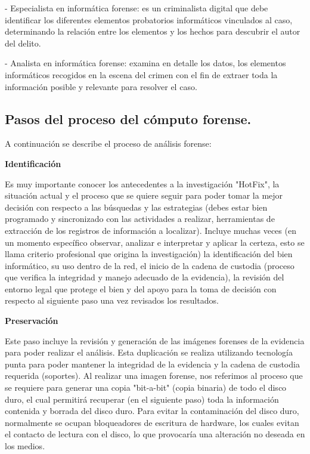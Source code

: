 - Especialista en informática forense: es un criminalista digital que debe identificar los diferentes elementos probatorios informáticos vinculados al caso, determinando la relación entre los elementos y los hechos para descubrir el autor del delito.

- Analista en informática forense: examina en detalle los datos, los elementos informáticos recogidos en la escena del crimen con el fin de extraer toda la información posible y relevante para resolver el caso.


\subsection{Pasos del proceso del cómputo forense.}

A continuación se describe el proceso de análisis forense:

\textbf{Identificación}

Es muy importante conocer los antecedentes a la investigación "HotFix", la situación actual y el proceso que se quiere seguir para poder tomar la mejor decisión con respecto a las búsquedas y las estrategias (debes estar bien programado y sincronizado con las actividades a realizar, herramientas de extracción de los registros de información a localizar). Incluye muchas veces (en un momento específico observar, analizar e interpretar y aplicar la certeza, esto se llama criterio profesional que origina la investigación) la identificación del bien informático, su uso dentro de la red, el inicio de la cadena de custodia (proceso que verifica la integridad y manejo adecuado de la evidencia), la revisión del entorno legal que protege el bien y del apoyo para la toma de decisión con respecto al siguiente paso una vez revisados los resultados.

\textbf{Preservación}

Este paso incluye la revisión y generación de las imágenes forenses de la evidencia para poder realizar el análisis. Esta duplicación se realiza utilizando tecnología punta para poder mantener la integridad de la evidencia y la cadena de custodia requerida (soportes). Al realizar una imagen forense, nos referimos al proceso que se requiere para generar una copia "bit-a-bit" (copia binaria) de todo el disco duro, el cual permitirá recuperar (en el siguiente paso) toda la información contenida y borrada del disco duro. Para evitar la contaminación del disco duro, normalmente se ocupan bloqueadores de escritura de hardware, los cuales evitan el contacto de lectura con el disco, lo que provocaría una alteración no deseada en los medios.

